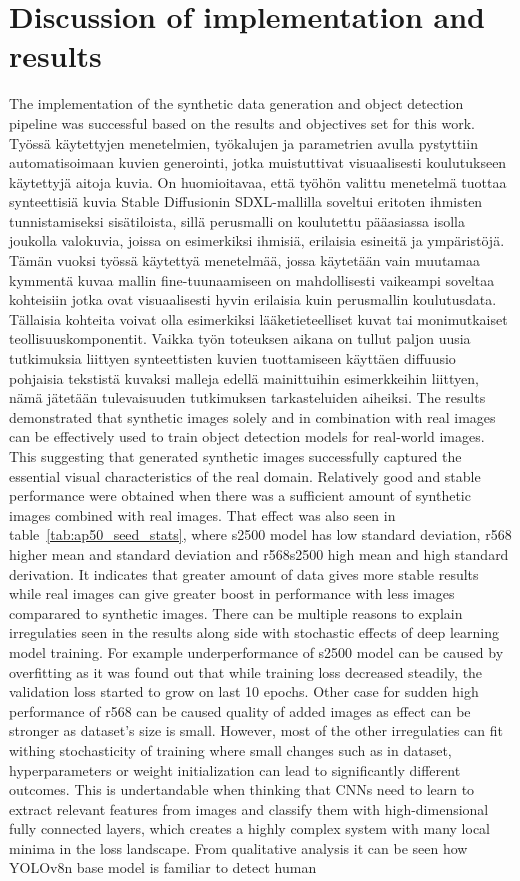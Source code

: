 \section{Discussion of implementation and results} The implementation of the synthetic data generation and object detection pipeline was successful based on the results and objectives set for this work. Työssä käytettyjen menetelmien, työkalujen ja parametrien avulla pystyttiin automatisoimaan kuvien generointi, jotka muistuttivat visuaalisesti koulutukseen käytettyjä aitoja kuvia. On huomioitavaa, että työhön valittu menetelmä tuottaa synteettisiä kuvia Stable Diffusionin SDXL-mallilla soveltui eritoten ihmisten tunnistamiseksi sisätiloista, sillä perusmalli on koulutettu pääasiassa isolla joukolla valokuvia, joissa on esimerkiksi ihmisiä, erilaisia esineitä ja ympäristöjä. Tämän vuoksi työssä käytettyä menetelmää, jossa käytetään vain muutamaa kymmentä kuvaa mallin fine-tuunaamiseen on mahdollisesti vaikeampi soveltaa kohteisiin jotka ovat visuaalisesti hyvin erilaisia kuin perusmallin koulutusdata. Tällaisia kohteita voivat olla esimerkiksi lääketieteelliset kuvat tai monimutkaiset teollisuuskomponentit. Vaikka työn toteuksen aikana on tullut paljon uusia tutkimuksia liittyen synteettisten kuvien tuottamiseen käyttäen diffuusio pohjaisia tekstistä kuvaksi malleja edellä mainittuihin esimerkkeihin liittyen, nämä jätetään tulevaisuuden tutkimuksen tarkasteluiden aiheiksi. The results demonstrated that synthetic images solely and in combination with real images can be effectively used to train object detection models for real-world images. This suggesting that generated synthetic images successfully captured the essential visual characteristics of the real domain. Relatively good and stable performance were obtained when there was a sufficient amount of synthetic images combined with real images. That effect was also seen in table~\ref{tab:ap50_seed_stats}, where s2500 model has low standard deviation, r568 higher mean and standard deviation and r568s2500 high mean and high standard derivation. It indicates that greater amount of data gives more stable results while real images can give greater boost in performance with less images comparared to synthetic images. There can be multiple reasons to explain irregulaties seen in the results along side with stochastic effects of deep learning model training. For example underperformance of s2500 model can be caused by overfitting as it was found out that while training loss decreased steadily, the validation loss started to grow on last 10 epochs. Other case for sudden high performance of r568 can be caused quality of added images as effect can be stronger as dataset's size is small. However, most of the other irregulaties can fit withing stochasticity of training where small changes such as in dataset, hyperparameters or weight initialization can lead to significantly different outcomes. This is undertandable when thinking that CNNs need to learn to extract relevant features from images and classify them with high-dimensional fully connected layers, which creates a highly complex system with many local minima in the loss landscape. From qualitative analysis it can be seen how YOLOv8n base model is familiar to detect human 